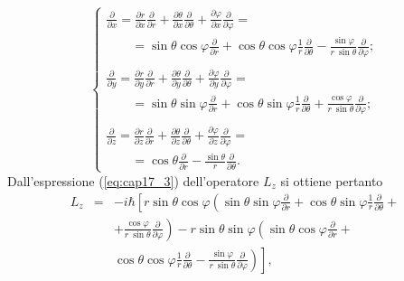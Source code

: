\documentclass[a4paper,12pt,oneside]{book}
\begin{document}
\begin{equation}
\begin{cases}
\displaystyle{\frac{\partial}{\partial x} = \frac{\partial r}{\partial x}\frac{\partial}{\partial r}+\frac{\partial \theta}{\partial x}\frac{\partial}{\partial \theta}+ \frac{\partial \varphi}{\partial x}\frac{\partial}{\partial \varphi} = }\\
\qquad = \displaystyle{\sin\theta \cos \varphi \frac{\partial}{\partial r}+\cos\theta \cos \varphi\frac{1}{r} \frac{\partial}{\partial \theta}-\frac{\sin \varphi}{r\ \sin \theta} \frac{\partial}{\partial \varphi}}; \\
\\
\displaystyle{\frac{\partial}{\partial y} = \frac{\partial r}{\partial y}\frac{\partial}{\partial r}+\frac{\partial \theta}{\partial y}\frac{\partial}{\partial \theta}+ \frac{\partial \varphi}{\partial y}\frac{\partial}{\partial \varphi} = }\\
\qquad = \displaystyle{\sin\theta \sin \varphi \frac{\partial}{\partial r}+\cos\theta \sin \varphi\frac{1}{r} \frac{\partial}{\partial \theta}+\frac{\cos \varphi}{r\ \sin \theta} \frac{\partial}{\partial \varphi}}; \\
\\
\displaystyle{\frac{\partial}{\partial z} = \frac{\partial r}{\partial z}\frac{\partial}{\partial r}+\frac{\partial \theta}{\partial z}\frac{\partial}{\partial \theta}+ \frac{\partial \varphi}{\partial z}\frac{\partial}{\partial \varphi} = }\\
\qquad = \displaystyle{\cos\theta\frac{\partial}{\partial r}-\frac{\sin \theta}{r} \frac{\partial}{\partial \theta}}.
\end{cases}
\end{equation}
Dall'espressione (\ref{eq:cap17_3}) dell'operatore $L_z$ si ottiene pertanto
\begin{eqnarray}
L_z &=&-i\hbar \left[ r\sin \theta \cos \varphi \left(\sin \theta \sin \varphi \frac{\partial}{\partial r}+\cos \theta \sin \varphi\frac{1}{r} \frac{\partial}{\partial \theta}+ \right.\right. \nonumber \\
& &\left. + \frac{\cos \varphi}{r\ \sin \theta} \frac{\partial}{\partial \varphi}\right) - r \sin \theta \sin \varphi \left( \sin \theta \cos \varphi \frac{\partial}{\partial r}+\right. \nonumber \\
& & \left. \left. \cos \theta \cos \varphi\frac{1}{r} \frac{\partial}{\partial \theta}-\frac{\sin \varphi}{r\ \sin \theta} \frac{\partial}{\partial \varphi}\right)\right] ,
\end{eqnarray}
\end{document}
